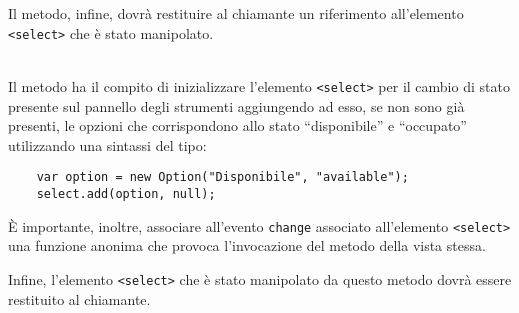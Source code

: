 \begin{description}
  Il metodo, infine, dovrà restituire al chiamante un riferimento all'elemento \verb'<select>' che è stato manipolato.
  
  \item{}\\
  Il metodo ha il compito di inizializzare l'elemento \verb'<select>' per il cambio di stato presente sul pannello degli strumenti aggiungendo ad esso, se non sono già presenti, le opzioni che corrispondono allo stato ``disponibile'' e ``occupato'' utilizzando una sintassi del tipo:
  \begin{verbatim}
    var option = new Option("Disponibile", "available");
    select.add(option, null);
  \end{verbatim}
  
  È importante, inoltre, associare all'evento \verb'change' associato all'elemento \verb'<select>' una funzione anonima che provoca l'invocazione del metodo  della vista stessa.
  
  Infine, l'elemento \verb'<select>' che è stato manipolato da questo metodo dovrà essere restituito al chiamante.

\end{description}

